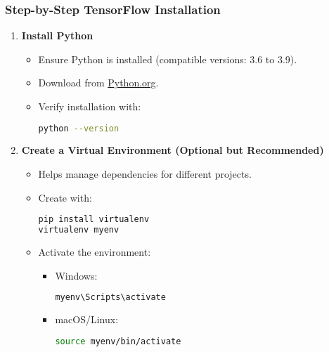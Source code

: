 \documentclass[aspectratio=169]{beamer}
\begin{document}
\begin{frame}[fragile]
    \frametitle{Step-by-Step TensorFlow Installation}
    \begin{enumerate}
        \item \textbf{Install Python}
        \begin{itemize}
            \item Ensure Python is installed (compatible versions: 3.6 to 3.9).
            \item Download from \href{https://www.python.org/downloads/}{Python.org}.
            \item Verify installation with:
            \begin{lstlisting}[language=bash]
python --version
            \end{lstlisting}
        \end{itemize}

        \item \textbf{Create a Virtual Environment (Optional but Recommended)}
        \begin{itemize}
            \item Helps manage dependencies for different projects.
            \item Create with:
            \begin{lstlisting}[language=bash]
pip install virtualenv
virtualenv myenv
            \end{lstlisting}
            \item Activate the environment:
            \begin{itemize}
                \item Windows:
                \begin{lstlisting}[language=bash]
myenv\Scripts\activate
                \end{lstlisting}
                \item macOS/Linux:
                \begin{lstlisting}[language=bash]
source myenv/bin/activate
                \end{lstlisting}
            \end{itemize}
        \end{itemize}
    \end{enumerate}
\end{frame}
\end{document}
